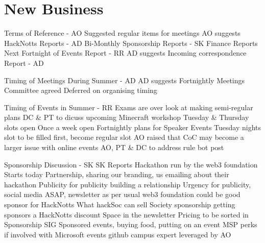 \documentclass[11pt]{meetingmins}
\begin{document}
\section{New Business}
\begin{items}
  \item
  Terms of Reference - AO
    \subitem
    Suggested regular items for meetings
    \subitem
    AO suggests
      \subsubitem
      HackNotts Reports - AD
      \subsubitem
      Bi-Monthly Sponsorship Reports - SK
      \subsubitem
      Finance Reports
      \subsubitem
      Next Fortnight of Events Report - RR
    \subitem
    AD suggests
      \subsubitem
      Incoming correspondence Report - AD

  \item
  Timing of Meetings During Summer - AD
    \subitem
    AD suggests Fortnightly Meetings
      \subsubitem
      Committee agreed
    \subitem
    Deferred on organising timing

  \item
  Timing of Events in Summer - RR
    \subitem
    Exams are over look at making semi-regular plans
    \subitem
    DC \& PT to dicuss upcoming Minecraft workshop
    \subitem
    Tuesday \& Thursday slots open
    \subitem 
    Once a week open
    \subitem
    Fortnightly plans for Speaker Events
    \subitem
    Tuesday nights slot to be filled first, become regular slot
    \subitem
    AO raised that CoC may become a larger issue with online events
      \subsubitem
      AO, PT \& DC to address rule bot post

  \item 
  Sponsorship Discussion - SK
    \subitem
    SK Reports
      \subsubitem
      Hackathon run by the web3 foundation
      \subsubitem
      Starts today
      \subsubitem
      Partnership, sharing our branding, us emailing about their hackathon
      \subsubitem
      Publicity for publicity building a relationship
      \subsubitem
      Urgency for publicity, social media ASAP, newsletter as per usual
      \subsubitem
      web3 foundation could be good sponsor for HackNotts
    \subitem
    What hackSoc can sell
      \subsubitem
      Society sponsorship getting sponsors a HackNotts discount
      \subsubitem
      Space in the newsletter
      \subsubitem
      Pricing to be sorted in Sponsorship SIG
      \subsubitem
      Sponsored events, buying food, putting on an event    
      \subsubitem
      MSP perks if involved with Microsoft events
      \subsubitem
      github campus expert leveraged by AO


\end{items}
\end{document}
